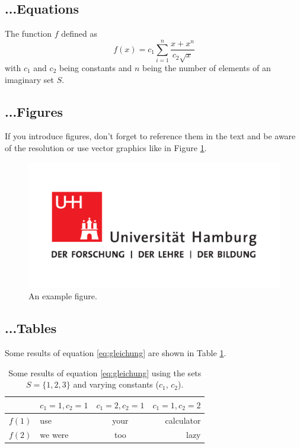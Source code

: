 \documentclass[a4paper,11pt,english]{article}
\begin{document}
\subsection{...Equations}
The function $f$ defined as
\begin{equation}
f(x) = c_1 \sum_{i=1}^n {\frac{x+x^n}{c_2 \sqrt{x}}}
\label{eq:gleichung}
\end{equation}
\noindent 
with $c_1$ and $c_2$ being constants and $n$ being the number of elements of an imaginary set $S$. 

\subsection{...Figures}
If you introduce figures, don't forget to reference them in the text and be aware of the resolution or use vector graphics like in Figure \ref{fig:logo}.

\begin{figure}
\begin{center}
\includegraphics[width=0.5\linewidth]{uhhlogo.pdf} 
\caption{An example figure.}
\label{fig:logo}
\end{center}
\end{figure}

\subsection{...Tables}
Some results of equation \ref{eq:gleichung} are shown in Table \ref{tab:results}.

\begin{table}[t] 
\begin{center}
\caption{Some results of equation \ref{eq:gleichung} using the sets $S = \{1,2,3\}$ and varying constants ($c_1$, $c_2$).}
\label{tab:results}
\begin{tabular}{|c|l|c|r|} 
\hline
  & $c_1 = 1, c_2 = 1$  & $c_1 = 2, c_2 = 1$  & $c_1 = 1, c_2 = 2$  \\
\hline
$f(1)$  & use  & your  & calculator  \\
$f(2)$  & we were  & too  & lazy  \\
\hline
\end{tabular}
\end{center}
\end{table}
\end{document}
